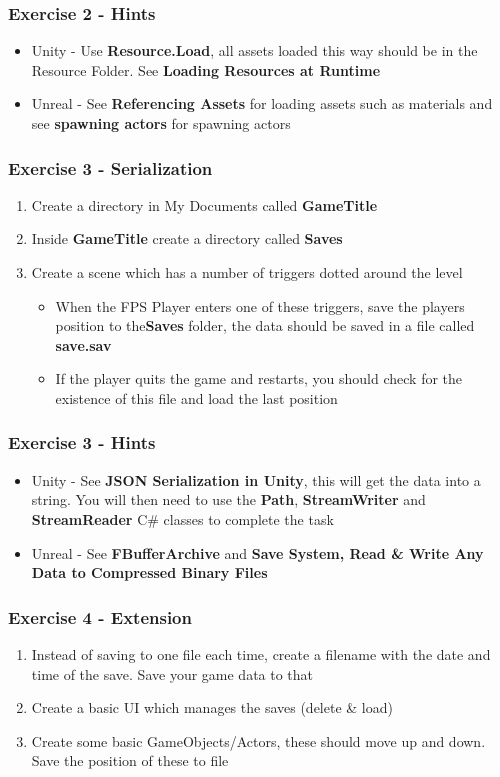 \begin{frame}
	\frametitle{Exercise 2 - Hints}
	\begin{itemize}
		\item Unity - Use \textbf{Resource.Load}, all assets loaded this way should be in the Resource Folder. See \textbf{Loading Resources at Runtime}
		\item Unreal - See \textbf{Referencing Assets} for loading assets such as materials and see \textbf{spawning actors} for spawning actors
	\end{itemize}
\end{frame}

\begin{frame}
	\frametitle{Exercise 3 - Serialization}
	\begin{enumerate}
		\item Create a directory in My Documents called \textbf{GameTitle}
		\item Inside \textbf{GameTitle} create a directory called \textbf{Saves}
		\item Create a scene which has a number of triggers dotted around the level
		\begin{itemize}
			\item When the FPS Player enters one of these triggers, save the players position to the\textbf{Saves} folder, the data should be saved in a file called \textbf{save.sav}
			\item If the player quits the game and restarts, you should check for the existence of this file and load the last position
		\end{itemize}
	\end{enumerate}
\end{frame}

\begin{frame}
	\frametitle{Exercise 3 - Hints}
	\begin{itemize}
		\item Unity - See \textbf{JSON Serialization in Unity}, this will get the data into a string. You will then need to use the \textbf{Path}, \textbf{StreamWriter} and \textbf{StreamReader} C\# classes to complete the task
		\item Unreal - See \textbf{FBufferArchive} and \textbf{Save System, Read \& Write Any Data to Compressed Binary Files}
	\end{itemize}
\end{frame}

\begin{frame}
	\frametitle{Exercise 4 - Extension}
	\begin{enumerate}
		\item Instead of saving to one file each time, create a filename with the date and time of the save. Save your game data to that
		\item Create a basic UI which manages the saves (delete \& load)
		\item Create some basic GameObjects/Actors, these should move up and down. Save the position of these to file
	\end{enumerate}
\end{frame}



